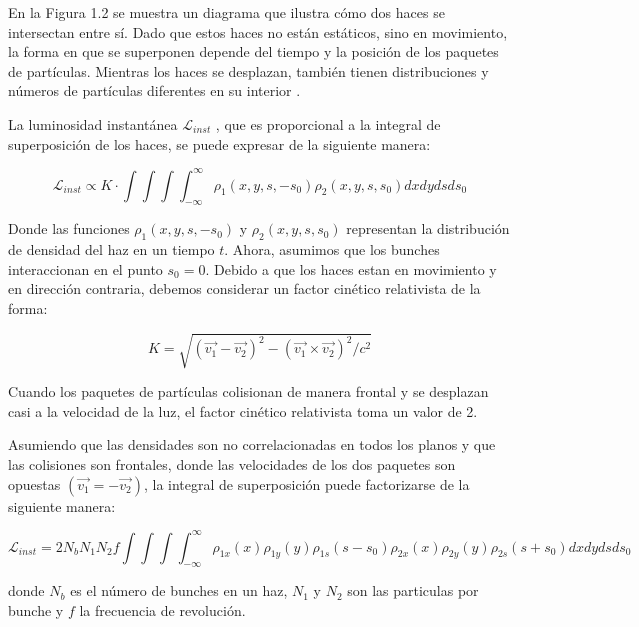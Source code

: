 En la Figura 1.2 se muestra un diagrama que ilustra cómo dos haces se intersectan entre sí. Dado que estos haces no están estáticos, sino en movimiento, la forma en que se superponen depende del tiempo y la posición de los paquetes de partículas. Mientras los haces se desplazan, también tienen distribuciones y números de partículas diferentes en su interior \cite{concept_of_luminosity}.

La luminosidad instantánea  \( \mathcal{L}_{inst} \) , que es proporcional a la integral de superposición de los haces, se puede expresar de la siguiente manera:
 
\begin{equation}
  \mathcal{L}_{inst}\propto K\cdot \int\int\int \int_{-\infty}^{\infty} \rho_{1}(x,y,s,-s_{0}) \rho_{2}(x,y,s,s_{0})dxdydsds_{0}
    \label{lumi_1}
\end{equation}
 
Donde las funciones $\rho_{1}(x,y,s,-s_{0})$ y $\rho_{2}(x,y,s,s_{0})$ representan la distribución de densidad del haz en un tiempo $t$. Ahora, asumimos que los bunches interaccionan en el punto $s_{0} = 0$. Debido a que los haces estan en movimiento y en dirección contraria, debemos considerar un factor cinético relativista de la forma:

\begin{equation}
 K = \sqrt{(\vec{v_{1}}-\vec{v_{2}})^{2}-(\vec{v_{1}}\times \vec{v_{2}})^{2}/c^{2}}
    \label{kinematic}
\end{equation}

Cuando los paquetes de partículas colisionan de manera frontal y se desplazan casi a la velocidad de la luz, el factor cinético relativista toma un valor de 2.

Asumiendo que las densidades son no correlacionadas en todos los planos y que las colisiones son frontales, donde las velocidades de los dos paquetes son opuestas $(\vec{v_{1}}=-\vec{v_{2}})$, la integral de superposición puede factorizarse de la siguiente manera:


\begin{equation}
  \mathcal{L}_{inst}= 2N_{b} N_{1}N_{2}f \int\int\int\int_{-\infty}^{\infty}  \rho_{1x}(x)\rho_{1y}(y)\rho_{1s}(s-s_{0})\rho_{2x}(x)\rho_{2y}(y)\rho_{2s}(s+s_{0}) dxdydsds_{0}
    \label{luminosity_2}
\end{equation}

donde $N_{b}$ es el número de bunches en un haz, $N_{1}$ y $N_{2}$ son las particulas por bunche y $f$ la frecuencia de revolución.\\



